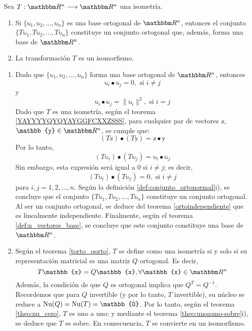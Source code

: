 \begin{theorem}
    Sea $T: \RR[n] \longrightarrow \RR[n]$ una isometría.
    \begin{enumerate}[label=\roman*)]
        \item Si $\{ \mathbb{u}_1, \mathbb{u}_2, \dots, \mathbb{u}_n \}$ es una base ortogonal de $\RR[n]$, entonces el conjunto
        $\{ T\mathbb{u}_1, T\mathbb{u}_2, \dots, T\mathbb{u}_n \}$ constituye un conjunto ortogonal que, además, forma una base de $\RR[n]$.
        \item La transformación $T$ es un isomorfismo.
    \end{enumerate}
    \demostracion
    \begin{enumerate}[label=\roman*)]
        \item Dado que $\{ \mathbb{u}_1, \mathbb{u}_2, \dots, \mathbb{u}_n \}$ forma una base ortogonal de $\RR[n]$, entonces
        $$\mathbb{u}_i \bullet \mathbb{u}_j = 0, \text{ si } i \neq j$$
        y
        $$\mathbb{u}_i \bullet \mathbb{u}_j = \| \mathbb{u}_i \|^2, \text{ si } i = j$$
        Dado que $T$ es una isometría, según el teorema \ref{YAYYYYQYQYAYGGFCXXZSSS}, para cualquier par de vectores $\mathbb{x}$, $\mathbb{y} \in \RR[n]$, se cumple que:
        $$(T\mathbb{x}) \bullet (T\mathbb{y}) = \mathbb{x} \bullet \mathbb{y}$$
        Por lo tanto,
        $$(T\mathbb{u}_i) \bullet (T\mathbb{u}_j) = \mathbb{u}_i \bullet \mathbb{u}_j$$
        Sin embargo, esta expresión será igual a $0$ si $i \neq j$; es decir,
        $$(T\mathbb{u}_i) \bullet (T\mathbb{u}_j) = 0, \text{ si } i \neq j$$
        para $i, j = 1, 2, \dots, n$. Según la definición \ref{def:conjunto_ortonormal}i), se concluye que el conjunto $\{ T\mathbb{u}_1, T\mathbb{u}_2, \dots, T\mathbb{u}_n \}$ constituye un conjunto ortogonal. Al ser un conjunto ortogonal, se deduce del teorema \ref{ortoindependiente} que es linealmente independiente. Finalmente, según el teorema \ref{def:n_vectores_base}, se concluye que este conjunto constituye una base de $\RR[n]$.
        \item Según el teorema \ref{torto_qorto}, $T$ se define como una isometría si y solo si su representación matricial es una matriz $Q$ ortogonal. Es decir,
        $$T\mathbb{x} = Q\mathbb{x}, \forall \mathbb{x} \in \RR[n]$$
        Además, la condición de que $Q$ es ortogonal implica que $Q^T = Q^{-1}$. Recordemos que para $Q$ invertible (y por lo tanto, $T$ invertible), su núcleo se reduce a $\Nuc(Q) = \Nuc(T) = { \mathbb{0} }$. Por lo tanto, según el teorema \ref{theo:nu_cero}, $T$ es uno a uno; y mediante el teorema \ref{theo:unoauno-sobre}i), se deduce que $T$ es sobre. En consecuencia, $T$ se convierte en un isomorfismo.
    \end{enumerate}
\end{theorem}

